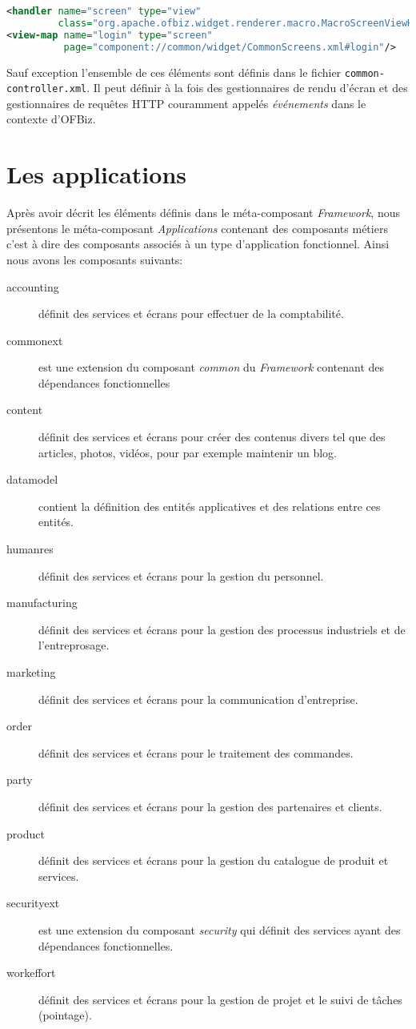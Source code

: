 \documentclass[a4paper, 11pt]{report}
\begin{document}
\begin{lstlisting}[language=xml]
<handler name="screen" type="view"
         class="org.apache.ofbiz.widget.renderer.macro.MacroScreenViewHandler"/>
<view-map name="login" type="screen"
          page="component://common/widget/CommonScreens.xml#login"/>
\end{lstlisting}

Sauf exception l'ensemble de ces éléments sont définis dans le fichier
\verb=common-controller.xml=. Il peut définir à la fois des
gestionnaires de rendu d'écran et des gestionnaires de requêtes HTTP
couramment appelés \emph{événements} dans le contexte d'OFBiz.

\section{Les applications}

Après avoir décrit les éléments définis dans le méta-composant
\emph{Framework}, nous présentons le méta-composant
\emph{Applications} contenant des composants métiers c'est à dire des
composants associés à un type d'application fonctionnel. Ainsi nous
avons les composants suivants:

\begin{description}
\item[accounting] définit des services et écrans pour effectuer de la
  comptabilité.
\item[commonext] est une extension du composant \emph{common} du
  \emph{Framework} contenant des dépendances fonctionnelles
\item[content] définit des services et écrans pour créer des contenus
  divers tel que des articles, photos, vidéos, pour par exemple
  maintenir un blog.
\item[datamodel] contient la définition des entités applicatives et
  des relations entre ces entités.
\item[humanres] définit des services et écrans pour la gestion du
  personnel.
\item[manufacturing] définit des services et écrans pour la gestion
  des processus industriels et de l'entreprosage.
\item[marketing] définit des services et écrans pour la communication
  d'entreprise.
\item[order] définit des services et écrans pour le traitement des
  commandes.
\item[party] définit des services et écrans pour la gestion des
  partenaires et clients.
\item[product] définit des services et écrans pour la gestion du
  catalogue de produit et services.
\item[securityext] est une extension du composant \emph{security} qui
  définit des services ayant des dépendances fonctionnelles.
\item[workeffort] définit des services et écrans pour la gestion de
  projet et le suivi de tâches (pointage).
\end{description}
\end{document}

